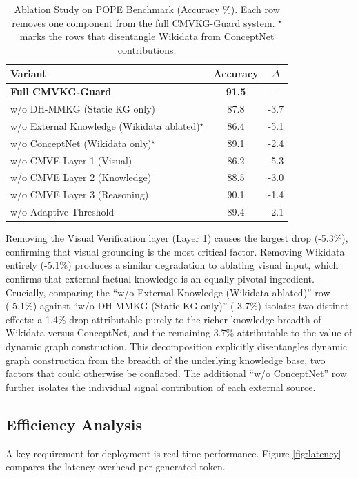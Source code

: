 \begin{table}[!htbp]
\centering
\caption{Ablation Study on POPE Benchmark (Accuracy \%). Each row removes one component from the full CMVKG-Guard system. $^\star$ marks the rows that disentangle Wikidata from ConceptNet contributions.}
\label{tab:ablation}
\begin{tabular}{l|c|c}
\hline
\textbf{Variant} & \textbf{Accuracy} & \textbf{$\Delta$} \\ \hline
\textbf{Full CMVKG-Guard} & \textbf{91.5} & - \\ \hline
w/o DH-MMKG (Static KG only) & 87.8 & -3.7 \\
w/o External Knowledge (Wikidata ablated)$^\star$ & 86.4 & -5.1 \\
w/o ConceptNet (Wikidata only)$^\star$ & 89.1 & -2.4 \\
w/o CMVE Layer 1 (Visual) & 86.2 & -5.3 \\
w/o CMVE Layer 2 (Knowledge) & 88.5 & -3.0 \\
w/o CMVE Layer 3 (Reasoning) & 90.1 & -1.4 \\
w/o Adaptive Threshold & 89.4 & -2.1 \\ \hline
\end{tabular}
\end{table}

Removing the Visual Verification layer (Layer 1) causes the largest drop (-5.3\%), confirming that visual grounding is the most critical factor. Removing Wikidata entirely (-5.1\%) produces a similar degradation to ablating visual input, which confirms that external factual knowledge is an equally pivotal ingredient. Crucially, comparing the ``w/o External Knowledge (Wikidata ablated)'' row (-5.1\%) against ``w/o DH-MMKG (Static KG only)'' (-3.7\%) isolates two distinct effects: a 1.4\% drop attributable purely to the richer knowledge breadth of Wikidata versus ConceptNet, and the remaining 3.7\% attributable to the value of dynamic graph construction. This decomposition explicitly disentangles dynamic graph construction from the breadth of the underlying knowledge base, two factors that could otherwise be conflated. The additional ``w/o ConceptNet'' row further isolates the individual signal contribution of each external source.

\subsection{Efficiency Analysis}
A key requirement for deployment is real-time performance. Figure \ref{fig:latency} compares the latency overhead per generated token.

